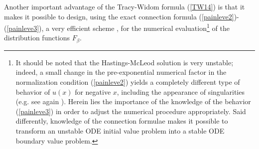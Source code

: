 \documentclass[11pt,letterpaper,reqno]{amsart}
\theoremstyle{definition}
\theoremstyle{remark}
\numberwithin{equation}{section}
\begin{document}
Another important advantage of  the  Tracy-Widom formula
(\ref{TW14}) is that it makes it possible to design, using the exact connection
formula (\ref{painleve2})-(\ref{painleve3}),  a very efficient
scheme \cite{Dieng}, \cite{Dris} for the numerical evaluation{\footnote{
It should be noted that
the Hastings-McLeod solution is very unstable; indeed, a small
change in the pre-exponential numerical factor in  the
normalization condition (\ref{painleve2}) yields a completely
different type of  behavior of $u(x)$ for negative $x$, including
the appearance of singularities (e.g. see again \cite{FIKN} ). Herein lies the
importance of the knowledge of the behavior (\ref{painleve3})
in order to adjust  the numerical procedure appropriately.
Said differently,  knowledge of the connection formulae
makes it possible to transform an unstable ODE initial value problem
into a stable ODE boundary value problem.}} of the distribution
functions $F_{\beta}$.

\end{document}

